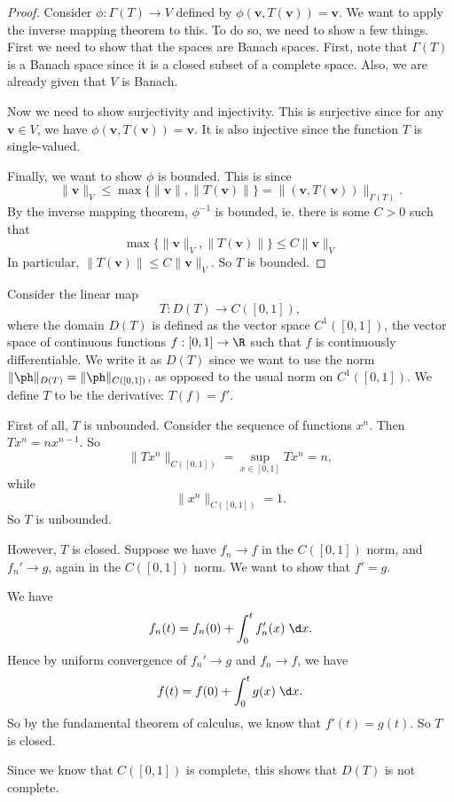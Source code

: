 \documentclass[a4paper]{article}
\begin{document}
\begin{proof}
  Consider $\phi: \Gamma(T) \to V$ defined by $\phi(\mathbf{v}, T(\mathbf{v})) = \mathbf{v}$. We want to apply the inverse mapping theorem to this. To do so, we need to show a few things. First we need to show that the spaces are Banach spaces. First, note that $\Gamma(T)$ is a Banach space since it is a closed subset of a complete space. Also, we are already given that $V$ is Banach.

  Now we need to show surjectivity and injectivity. This is surjective since for any $\mathbf{v}\in V$, we have $\phi(\mathbf{v}, T(\mathbf{v})) = \mathbf{v}$. It is also injective since the function $T$ is single-valued.

  Finally, we want to show $\phi$ is bounded. This is since
  \[
    \|\mathbf{v}\|_V \leq \max\{\|\mathbf{v}\|, \|T(\mathbf{v})\|\} = \|(\mathbf{v}, T(\mathbf{v}))\|_{\Gamma(T)}.
  \]
  By the inverse mapping theorem, $\phi^{-1}$ is bounded, ie. there is some $C > 0$ such that
  \[
    \max\{\|\mathbf{v}\|_V, \|T(\mathbf{v})\|\} \leq C\|\mathbf{v}\|_V
  \]
  In particular, $\|T(\mathbf{v})\| \leq C\|\mathbf{v}\|_V$. So $T$ is bounded.
\end{proof}

\begin{eg}
  Consider the linear map
  \[
    T: D(T) \to C([0, 1]),
  \]
  where the domain $D(T)$ is defined as the vector space $C^1([0, 1])$, the vector space of continuous functions $f: [0, 1] \to \R$ such that $f$ is continuously differentiable. We write it as $D(T)$ since we want to use the norm $\|\ph \|_{D(T)} = \|\ph \|_{C([0, 1])}$, as opposed to the usual norm on $C^1([0, 1])$. We define $T$ to be the derivative: $T(f) = f'$.

  First of all, $T$ is unbounded. Consider the sequence of functions $x^n$. Then $Tx^n = nx^{n - 1}$. So
  \[
    \|T x^n\|_{C([0, 1])} = \sup_{x \in [0, 1]} Tx^n = n,
  \]
  while
  \[
    \|x^n\|_{C([0, 1])} = 1.
  \]
  So $T$ is unbounded.

  However, $T$ is closed. Suppose we have $f_n \to f$ in the $C([0, 1])$ norm, and $f_n' \to g$, again in the $C([0, 1])$ norm. We want to show that $f' = g$.

  We have
  \[
    f_n(t) = f_n(0) + \int_0^t f'_n(x) \;\d x.
  \]
  Hence by uniform convergence of $f_n' \to g$ and $f_n \to f$, we have
  \[
    f(t) = f(0) + \int_0^t g(x)\;\d x.
  \]
  So by the fundamental theorem of calculus, we know that $f'(t) = g(t)$. So $T$ is closed.

  Since we know that $C([0, 1])$ is complete, this shows that $D(T)$ is not complete.
\end{eg}
\end{document}
